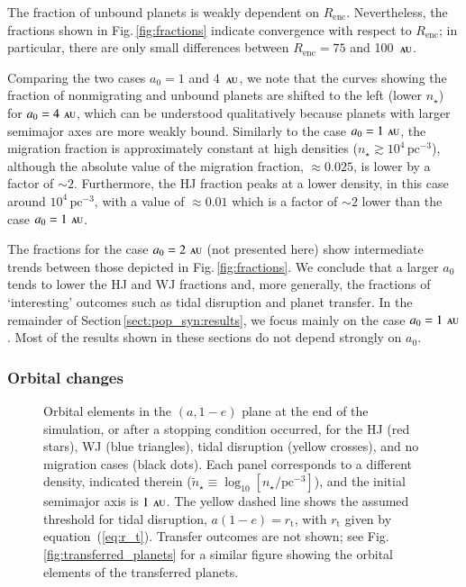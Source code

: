 \documentclass[iop,usenatbib]{emulateapj}
\renewcommand{\S}{Section}
\newcommand{\F}{Fig.}
\newcommand{\au}{\,\textsc{au}}
\newcommand{\renc}{R_\mathrm{enc}}
\begin{document}
The fraction of unbound planets is weakly dependent on $\renc$.  Nevertheless, the fractions shown in \F\,\ref{fig:fractions} indicate convergence with respect to $\renc$; in particular, there are only small differences between $\renc=75$ and 100 $\au$. 

Comparing the two cases $a_0=1$ and 4 $\au$, we note that the curves showing the fraction of nonmigrating and unbound planets are shifted to the left (lower $n_\star$) for $a_0=4\,\au$, which can be understood qualitatively because planets with larger semimajor axes are more weakly bound. Similarly to the case $a_0=1\,\au$, the migration fraction is approximately constant at high densities ($n_\star \gtrsim 10^4\,\mathrm{pc^{-3}}$), although the absolute value of the migration fraction, $\approx 0.025$, is lower by a factor of $\sim 2$. Furthermore, the HJ fraction peaks at a lower density, in this case around $10^4\,\mathrm{pc^{-3}}$, with a value of $\approx 0.01$ which is a factor of $\sim 2$ lower than the case $a_0=1\,\au$. 

The fractions for the case $a_0=2\,\au$ (not presented here) show intermediate trends between those depicted in \F\,\ref{fig:fractions}. We conclude that a larger $a_0$ tends to lower the HJ and WJ fractions and, more generally, the fractions of `interesting' outcomes such as tidal disruption and planet transfer. In the remainder of \S\,\ref{sect:pop_syn:results}, we focus mainly on the case $a_0=1\,\au$. Most of the results shown in these sections do not depend strongly on $a_0$.


\subsubsection{Orbital changes}
\label{sect:pop_syn:orb}

\begin{figure}
\center
\iftoggle{ApJFigs}{
\texttt{[image: a\_e\_plane\_run05.eps]}
}{
\texttt{[image: figs/a\_e\_plane\_run05.eps]}
}
\caption { Orbital elements in the $(a,1-e)$ plane at the end of the simulation, or after a stopping condition occurred, for the HJ (red stars), WJ  (blue triangles), tidal disruption (yellow crosses), and no migration cases (black dots). Each panel corresponds to a different density, indicated therein ($\tilde{n}_\star \equiv \log_{10}[n_\star/\mathrm{pc^{-3}}]$), and the initial semimajor axis is $1\,\au$. The yellow dashed line shows the assumed threshold for tidal disruption, $a(1-e) = r_\mathrm{t}$, with $r_\mathrm{t}$ given by equation~(\ref{eq:r_t}). Transfer outcomes are not shown; see \F\,\ref{fig:transferred_planets} for a similar figure showing the orbital elements of the transferred planets. }
\label{fig:a_e_plane_sim}
\end{figure}
\end{document}
